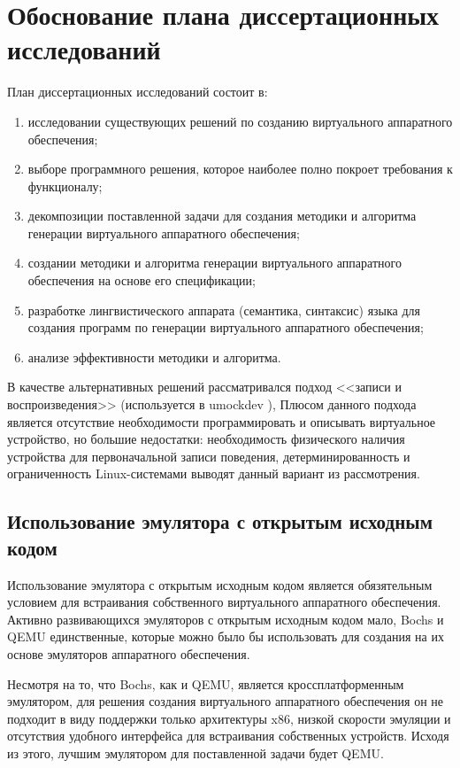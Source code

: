 \section{Обоснование плана диссертационных исследований}\label{sec:ch1/sec3}

План диссертационных исследований состоит в:

\begin{enumerate}[label={\arabic*)}]
    \item исследовании существующих решений по созданию виртуального аппаратного обеспечения;
    \item выборе программного решения, которое наиболее полно покроет требования к функционалу;
    \item декомпозиции поставленной задачи для создания методики и алгоритма генерации виртуального аппаратного обеспечения;
    \item создании методики и алгоритма генерации виртуального аппаратного обеспечения на основе его спецификации;
    \item разработке лингвистического аппарата (семантика, синтаксис) языка для создания программ по генерации виртуального
        аппаратного обеспечения;
    \item анализе эффективности методики и алгоритма.
\end{enumerate}

В качестве альтернативных решений рассматривался подход <<записи и воспроизведения>> (используется в umockdev \cite{umockdev}),
Плюсом данного подхода является отсутствие необходимости программировать и описывать виртуальное устройство,
но большие недостатки: необходимость физического наличия устройства для первоначальной записи
поведения, детерминированность и ограниченность Linux-системами выводят данный вариант из рассмотрения.

\subsection{Использование эмулятора с открытым исходным кодом}\label{sec:ch1/sec4/sub1}

Использование эмулятора с открытым исходным кодом является обязятельным
условием для встраивания собственного виртуального аппаратного обеспечения.
Активно развивающихся эмуляторов с открытым исходным кодом мало, Bochs \cite{bochs} и QEMU
единственные, которые можно было бы использовать для создания на их основе
эмуляторов аппаратного обеспечения.

Несмотря на то, что Bochs, как и QEMU, является кроссплатформенным эмулятором,
для решения создания виртуального аппаратного обеспечения
он не подходит в виду поддержки только архитектуры x86, низкой скорости эмуляции
и отсутствия удобного интерфейса для встраивания собственных устройств.
Исходя из этого, лучшим эмулятором для поставленной задачи будет QEMU.

